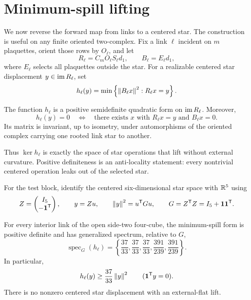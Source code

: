 \section{Minimum-spill lifting}
\label{sec:spill}

We now reverse the forward map from links to a centered star.  The construction
is useful on any finite oriented two-complex.  Fix a link $\ell$ incident on
$m$ plaquettes, orient those rows by $O_\ell$, and let
\[
 R_\ell=C_mO_\ell S_\ell d_1,
 \qquad B_\ell=E_\ell d_1,
\]
where $E_\ell$ selects all plaquettes outside the star.  For a realizable
centered star displacement $y\in\operatorname{im} R_\ell$, set
\begin{equation}
\label{eq:spill-form}
 h_\ell(y)=\min\left\{\left\lVert B_\ell x\right\rVert^2:R_\ell x=y\right\}.
\end{equation}

\begin{proposition}
\label{prop:general-spill}
The function $h_\ell$ is a positive semidefinite quadratic form on
$\operatorname{im} R_\ell$.  Moreover,
\[
 h_\ell(y)=0
 \quad\Longleftrightarrow\quad
 \text{there exists }x\text{ with }R_\ell x=y\text{ and }B_\ell x=0.
\]
Its matrix is invariant, up to isometry, under automorphisms of the oriented
complex carrying one rooted link star to another.
\end{proposition}

Thus $\ker h_\ell$ is exactly the space of star operations that lift without
external curvature.  Positive definiteness is an anti-locality statement:
every nontrivial centered operation leaks out of the selected star.

For the test block, identify the centered six-dimensional star space with
$\mathbb{R}^5$ using
\[
 Z=\begin{pmatrix}I_5\\-\mathbf1^\mathsf T\end{pmatrix},
 \qquad y=Zu,
 \qquad \left\lVert y\right\rVert^2=u^\mathsf TGu,
 \qquad G=Z^\mathsf TZ=I_5+\mathbf1\mathbf1^\mathsf T.
\]

\begin{theorem}
\label{thm:spill-spectrum}
For every interior link of the open side-two four-cube, the minimum-spill form
is positive definite and has generalized spectrum, relative to $G$,
\[
 \operatorname{spec}_G(h_\ell)=
 \left\{
 \frac{37}{33},\frac{37}{33},\frac{37}{33},
 \frac{391}{239},\frac{391}{239}
 \right\}.
\]
In particular,
\begin{equation}
\label{eq:spill-lower}
 h_\ell(y)\ge\frac{37}{33}\left\lVert y\right\rVert^2
 \qquad (\mathbf1^\mathsf Ty=0).
\end{equation}
There is no nonzero centered star displacement with an external-flat lift.
\end{theorem}

